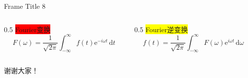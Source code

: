\documentclass{beamer}
\begin{document}
\begin{frame}{Frame Title 8}
    \begin{columns}
        \begin{column}{0.5\linewidth}
            \colorbox{red}{Fourier变换}
            \[
            F(\omega) = \frac{1}{\sqrt{2\pi}}\int_{-\infty}^{\infty}f(t)\mathrm{e}^{-i\omega t}\,\mathrm{d}t
            \]
        \end{column}
        \begin{column}{0.5\linewidth}
            \colorbox{yellow}{Fourier逆变换}
            \[
            f(t) = \frac{1}{\sqrt{2\pi}}\int_{-\infty}^{\infty}F(\omega)\mathrm{e}^{i\omega t}\,\mathrm{d}\omega
            \]
        \end{column}
    \end{columns}
\end{frame}

\begin{frame}
    \begin{center}
        \Huge 谢谢大家！
    \end{center}
\end{frame}
\end{document}
